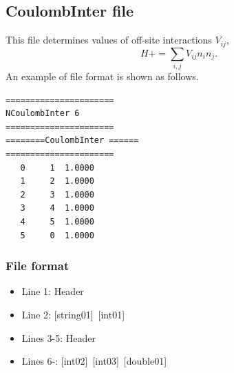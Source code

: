 \newpage
\subsection{CoulombInter file}
This file determines values of off-site interactions $V_{ij}$,
\begin{equation}
H+=\sum_{i,j}V_{ij} n_ {i}n_{j}.
\end{equation}
An example of file format is shown as follows.

\begin{minipage}{12.5cm}
\begin{screen}
\begin{verbatim}
====================== 
NCoulombInter 6  
====================== 
========CoulombInter ====== 
====================== 
   0     1  1.0000
   1     2  1.0000
   2     3  1.0000
   3     4  1.0000
   4     5  1.0000
   5     0  1.0000
\end{verbatim}
\end{screen}
\end{minipage}

\subsubsection{File format}
 \begin{itemize}
   \item  Line 1:  Header
   \item  Line 2:   [string01]~[int01]
   \item  Lines 3-5:  Header
   \item  Lines 6-: 
   [int02]~[int03]~[double01] 
  \end{itemize}
